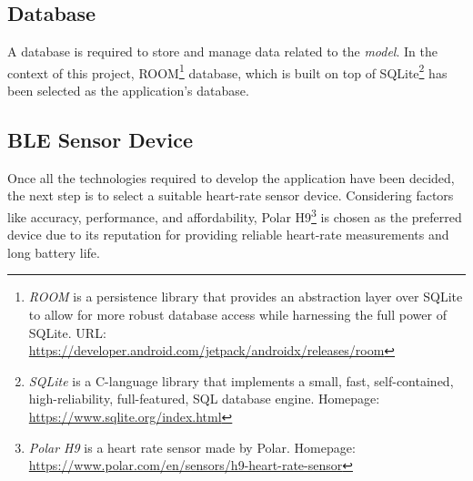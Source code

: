 \subsection{Database}
A database is required to store and manage data related to the \emph{model}. In the context of this project, ROOM\footnote{\emph{ROOM} is a persistence library that provides an abstraction layer over SQLite to allow for more robust database access while harnessing the full power of SQLite. URL: \url{https://developer.android.com/jetpack/androidx/releases/room}} database, which is built on top of SQLite\footnote{\emph{SQLite} is a C-language library that implements a small, fast, self-contained, high-reliability, full-featured, SQL database engine. Homepage: \url{https://www.sqlite.org/index.html}} has been selected as the application's database.

\subsection{BLE Sensor Device}
Once all the technologies required to develop the application have been decided, the next step is to select a suitable heart-rate sensor device. Considering factors like accuracy, performance, and affordability, Polar H9\footnote{\emph{Polar H9} is a heart rate sensor made by Polar. Homepage: \url{https://www.polar.com/en/sensors/h9-heart-rate-sensor}} is chosen as the preferred device due to its reputation for providing reliable heart-rate measurements and long battery life.